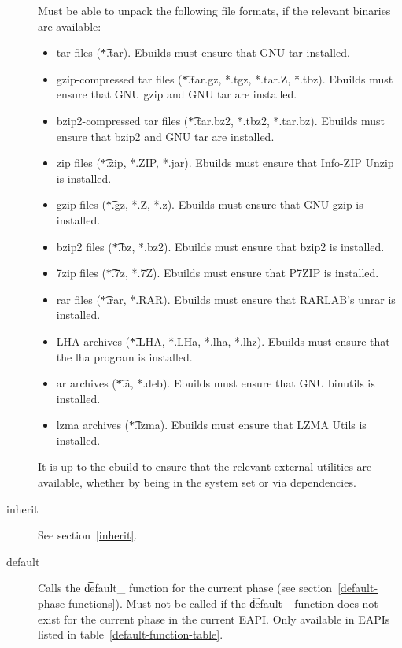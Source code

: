 \begin{description}
    Must be able to unpack the following file formats, if the relevant binaries are available:
    \begin{itemize}
    \item tar files (\t{*.tar}). Ebuilds must ensure that GNU tar installed.
    \item gzip-compressed tar files (\t{*.tar.gz, *.tgz, *.tar.Z, *.tbz}). Ebuilds must ensure that
    GNU gzip and GNU tar are installed.
    \item bzip2-compressed tar files (\t{*.tar.bz2, *.tbz2, *.tar.bz}). Ebuilds must ensure that
    bzip2 and GNU tar are installed.
    \item zip files (\t{*.zip, *.ZIP, *.jar}). Ebuilds must ensure that Info-ZIP Unzip is installed.
    \item gzip files (\t{*.gz, *.Z, *.z}). Ebuilds must ensure that GNU gzip is installed.
    \item bzip2 files (\t{*.bz, *.bz2}). Ebuilds must ensure that bzip2 is installed.
    \item 7zip files (\t{*.7z, *.7Z}). Ebuilds must ensure that P7ZIP is installed.
    \item rar files (\t{*.rar, *.RAR}). Ebuilds must ensure that RARLAB's unrar is installed.
    \item LHA archives (\t{*.LHA, *.LHa, *.lha, *.lhz}). Ebuilds must ensure that the lha program is
    installed.
    \item ar archives (\t{*.a, *.deb}). Ebuilds must ensure that GNU binutils is installed.
    \item lzma archives (\t{*.lzma}). Ebuilds must ensure that LZMA Utils is installed.
    \end{itemize}
    It is up to the ebuild to ensure that the relevant external utilities are available, whether by
    being in the system set or via dependencies.

\item[inherit] See section~\ref{inherit}.

\item[default] Calls the \t{default\_} function for the current phase (see section~\ref{default-phase-functions}).
    Must not be called if the \t{default\_} function does not exist for the current phase in the current EAPI.
    Only available in EAPIs listed in table~\ref{default-function-table}.
\end{description}


